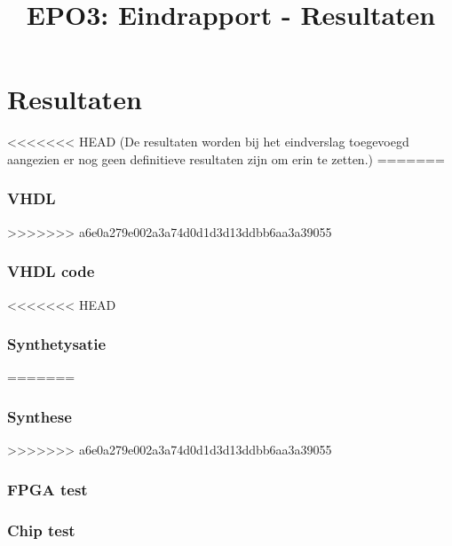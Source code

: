 \documentclass{scrartcl} %
\author{}
\title{EPO3: Eindrapport - Resultaten}
\begin{document}
\chapter{Resultaten}
\label{ch:resultaten}

<<<<<<< HEAD
(De resultaten worden bij het eindverslag toegevoegd aangezien er nog geen definitieve resultaten zijn om erin te zetten.)
=======
\subsection{VHDL}
>>>>>>> a6e0a279e002a3a74d0d1d3d13ddbb6aa3a39055

\subsection{VHDL code}


<<<<<<< HEAD
\subsection{Synthetysatie}
=======
\subsection{Synthese}
>>>>>>> a6e0a279e002a3a74d0d1d3d13ddbb6aa3a39055



\subsection{FPGA test}



\subsection{Chip test}
\end{document}
